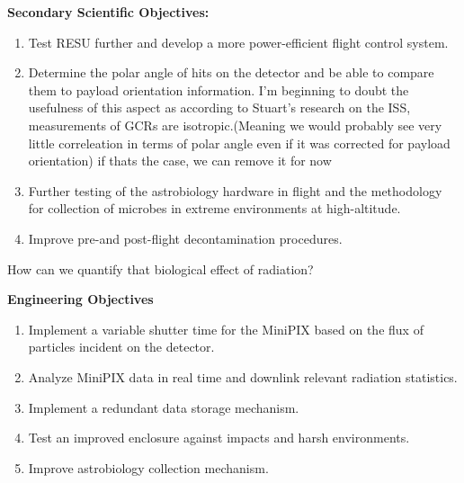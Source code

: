 {\bf Secondary Scientific Objectives:}
	\begin{enumerate}
	\item Test RESU further and develop a more power-efficient flight control system.
	\item Determine the polar angle of hits on the detector and be able to compare them to payload orientation information.
	 {I'm beginning to doubt the usefulness of this aspect as according to Stuart's research on the ISS, measurements of GCRs are isotropic.(Meaning we would probably see very little correleation in terms of polar angle even if it was corrected for payload orientation)}
	 {if thats the case, we can remove it for now}
	\item Further testing of the astrobiology hardware in flight and the methodology for collection of microbes in extreme environments at high-altitude.
	\item Improve pre-and post-flight decontamination procedures.
	\end{enumerate}

 {How can we quantify that biological effect of radiation?}


{\bf Engineering Objectives}
	\begin{enumerate}
	\item Implement a variable shutter time for the MiniPIX based on the flux of particles incident on the detector.
	\item Analyze MiniPIX data in real time and downlink relevant radiation statistics.
	\item Implement a redundant data storage mechanism.
	\item Test an improved enclosure against impacts and harsh environments.
	\item Improve astrobiology collection mechanism.
	\end{enumerate}

